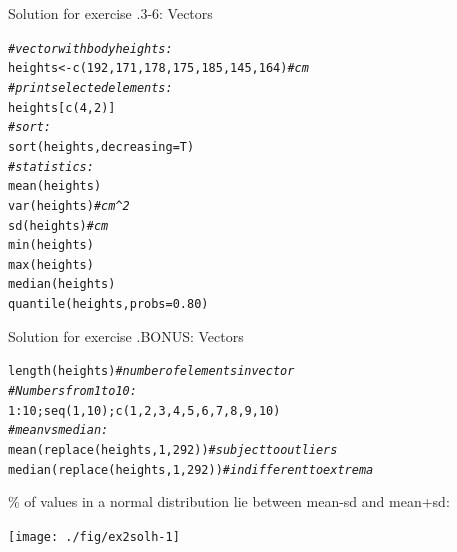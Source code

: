 \documentclass[xcolor=table,       handout,    xcolor=dvipsnames]{beamer}\usepackage[]{graphicx}\usepackage[]{color}
\makeatletter
\newcommand{\hlnum}[1]{\textcolor[rgb]{0,0,0}{#1}}
\newcommand{\hlcom}[1]{\textcolor[rgb]{0,0.392,0}{\textit{#1}}}
\newcommand{\hlopt}[1]{\textcolor[rgb]{0,0,0}{#1}}
\newcommand{\hlstd}[1]{\textcolor[rgb]{0,0,0}{#1}}
\newcommand{\hlkwb}[1]{\textcolor[rgb]{0,0,0}{#1}}
\newcommand{\hlkwc}[1]{\textcolor[rgb]{1,0,1}{#1}}
\newcommand{\hlkwd}[1]{\textcolor[rgb]{0,0,1}{#1}}
\newenvironment{kframe}{%
 \def\at@end@of@kframe{}%
 \ifinner\ifhmode%
  \def\at@end@of@kframe{\end{minipage}}%
  \begin{minipage}{\columnwidth}%
 \fi\fi%
 \def\FrameCommand##1{\hskip\@totalleftmargin \hskip-\fboxsep
 \colorbox{shadecolor}{##1}\hskip-\fboxsep
     \hskip-\linewidth \hskip-\@totalleftmargin \hskip\columnwidth}%
 \MakeFramed {\advance\hsize-\width
   \@totalleftmargin\z@ \linewidth\hsize
   \@setminipage}}%
 {\par\unskip\endMakeFramed%
 \at@end@of@kframe}
\newenvironment{knitrout}{}{} %
\newcounter{exercisecount}
\makeatother
\begin{document}

\begin{frame}[fragile]{Solution for exercise .3-6: Vectors}
\begin{knitrout}
\color{fgcolor}\begin{kframe}
\begin{alltt}
\hlcom{# vector with body heights:}
\hlstd{heights} \hlkwb{<-} \hlkwd{c}\hlstd{(}\hlnum{192}\hlstd{,} \hlnum{171}\hlstd{,} \hlnum{178}\hlstd{,} \hlnum{175}\hlstd{,} \hlnum{185}\hlstd{,} \hlnum{145}\hlstd{,} \hlnum{164}\hlstd{)} \hlcom{# cm}
\hlcom{# print selected elements:}
\hlstd{heights[} \hlkwd{c}\hlstd{(}\hlnum{4}\hlstd{,}\hlnum{2}\hlstd{) ]}
\hlcom{# sort:}
\hlkwd{sort}\hlstd{(heights,} \hlkwc{decreasing}\hlstd{=T)}
\hlcom{# statistics:}
\hlkwd{mean}\hlstd{(heights)}
\hlkwd{var}\hlstd{(heights)} \hlcom{# cm^2}
\hlkwd{sd}\hlstd{(heights)} \hlcom{# cm}
\hlkwd{min}\hlstd{(heights)}
\hlkwd{max}\hlstd{(heights)}
\hlkwd{median}\hlstd{(heights)}
\hlkwd{quantile}\hlstd{(heights,} \hlkwc{probs}\hlstd{=}\hlnum{0.80}\hlstd{)}
\end{alltt}
\end{kframe}
\end{knitrout}
\end{frame}


\begin{frame}[fragile]{Solution for exercise .BONUS: Vectors}
\begin{knitrout}
\color{fgcolor}\begin{kframe}
\begin{alltt}
\hlkwd{length}\hlstd{(heights)} \hlcom{# number of elements in vector}
\hlcom{# Numbers from 1 to 10:}
\hlnum{1}\hlopt{:}\hlnum{10}  \hlstd{;}  \hlkwd{seq}\hlstd{(}\hlnum{1}\hlstd{,}\hlnum{10}\hlstd{)  ;}  \hlkwd{c}\hlstd{(}\hlnum{1}\hlstd{,}\hlnum{2}\hlstd{,}\hlnum{3}\hlstd{,}\hlnum{4}\hlstd{,}\hlnum{5}\hlstd{,}\hlnum{6}\hlstd{,}\hlnum{7}\hlstd{,}\hlnum{8}\hlstd{,}\hlnum{9}\hlstd{,}\hlnum{10}\hlstd{)}
\hlcom{# mean vs median:}
\hlkwd{mean}\hlstd{(}   \hlkwd{replace}\hlstd{(heights,} \hlnum{1}\hlstd{,} \hlnum{292}\hlstd{) )} \hlcom{# subject to outliers}
\hlkwd{median}\hlstd{(} \hlkwd{replace}\hlstd{(heights,} \hlnum{1}\hlstd{,} \hlnum{292}\hlstd{) )} \hlcom{# indifferent to extrema}
\end{alltt}
\end{kframe}
\end{knitrout}
\% of values in a normal distribution lie between mean-sd and mean+sd:
\begin{knitrout}
\color{fgcolor}

{\centering \texttt{[image: ./fig/ex2solh-1]} 

}



\end{knitrout}
\end{frame}
\end{document}

